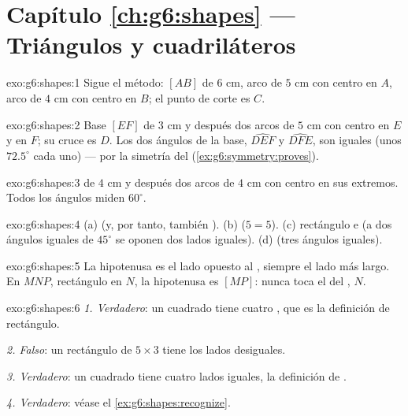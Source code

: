 \section*{Capítulo \ref{ch:g6:shapes} --- Triángulos y cuadriláteros}

\begin{solution}{exo:g6:shapes:1}
Sigue el método:  $[AB]$ de $6$ cm, arco de  $5$ cm
con centro en $A$, arco de  $4$ cm con centro en $B$; el punto de
corte es $C$.
\end{solution}

\begin{solution}{exo:g6:shapes:2}
Base $[EF]$ de $3$ cm y después dos arcos de  $5$ cm con centro en $E$
y en $F$; su cruce es $D$. Los dos ángulos de la base, $\widehat{DEF}$
y $\widehat{DFE}$, son iguales (unos $72.5^\circ$ cada uno) --- por la simetría
del  (\cref{ex:g6:symmetry:proves}).
\end{solution}

\begin{solution}{exo:g6:shapes:3}
 de $4$ cm y después dos arcos de  $4$ cm con centro en sus
extremos. Todos los ángulos miden $60^\circ$.
\end{solution}

\begin{solution}{exo:g6:shapes:4}
(a)  (y, por tanto, también ). \quad
(b)  ($5 = 5$). \quad
(c) rectángulo e  (a dos ángulos iguales de $45^\circ$ se oponen dos
lados iguales). \quad
(d)  (tres ángulos iguales).
\end{solution}

\begin{solution}{exo:g6:shapes:5}
La hipotenusa es el lado opuesto al , siempre el lado más
largo. En $MNP$, rectángulo en $N$, la hipotenusa es $[MP]$: nunca
toca el  del , $N$.
\end{solution}

\begin{solution}{exo:g6:shapes:6}
\emph{1. Verdadero}: un cuadrado tiene cuatro , que es la
definición de rectángulo.

\emph{2. Falso}: un rectángulo de $5 \times 3$ tiene los lados desiguales.

\emph{3. Verdadero}: un cuadrado tiene cuatro lados iguales, la definición de
.

\emph{4. Verdadero}: véase el \cref{ex:g6:shapes:recognize}.
\end{solution}


